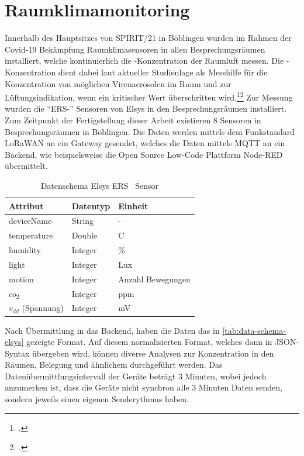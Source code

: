 \section{Raumklimamonitoring}
Innerhalb des Hauptsitzes von SPIRIT/21 in Böblingen wurden im Rahmen der Covid-19 Bekämpfung Raumklimasensoren in allen Besprechungsräumen installiert, welche kontinuierlich die \coo{}-Konzentration der Raumluft messen. Die \coo{}-Konzentration dient dabei laut aktueller Studienlage als Messhilfe für die Konzentration von möglichen Virenaerosolen im Raum und zur Lüftungsindikation, wenn ein kritischer Wert überschritten wird.\footcite[Vgl.][]{Hartmann.2020}\nzitat\footcite[Vgl.][]{Peng.2020} Zur Messung wurden die \enquote{ERS-\coo{}} Sensoren von Elsys in den Besprechungsräumen installiert. Zum Zeitpunkt der Fertigstellung dieser Arbeit existieren 8 Sensoren in Besprechungsräumen in Böblingen. Die Daten werden mittels dem Funkstandard \ac{LoRaWAN} an ein Gateway gesendet, welches die Daten mittels \ac{MQTT} an ein Backend, wie beispielsweise die Open Source Low-Code Plattform Node-RED übermittelt. 

\begin{table}[H]
\centering
\begin{tabular}{|l|l|l|}
\hline
Attribut    & Datentyp & Einheit           \\ \hline
deviceName  & String   & -                 \\ \hline
temperature & Double   & \textdegree{}C     \\ \hline
humidity    & Integer  & \%                \\ \hline
light       & Integer  & Lux               \\ \hline
motion      & Integer  & Anzahl Bewegungen \\ \hline
$co_2$        & Integer  & ppm               \\ \hline
$v_{dd}$ (Spannung)         & Integer  & mV                \\ \hline
\end{tabular}
\caption[Datenschema Elsys ERS \coo{}~Sensor]{Datenschema Elsys ERS \coo{}~Sensor\footnotemark}
\label{tab:data-schema-elsys}
\end{table}
Nach Übermittlung in das Backend, haben die Daten das in \autoref{tab:data-schema-elsys} gezeigte Format. Auf diesem normalisierten Format, welches dann in \ac{JSON}-Syntax übergeben wird, können diverse Analysen zur \coo{} Konzentration in den Räumen, Belegung und ähnlichem durchgeführt werden. Das Datenübermittlungsintervall der Geräte beträgt 3 Minuten, wobei jedoch anzumerken ist, dass die Geräte nicht synchron alle 3 Minuten Daten senden, sondern jeweils einen eigenen Senderythmus haben.

